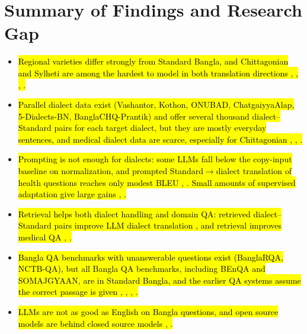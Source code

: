\section{Summary of Findings and Research Gap}\label{summary-of-findings-and-research-gap}

\begin{itemize}
\item \hl{Regional varieties differ strongly from Standard Bangla, and
Chittagonian and Sylheti are among the hardest to model in both
translation directions \cite{jawad2026fivedialects}, \cite{faria2023vashantor}, \cite{khandaker2024bridging}, \cite{prantik2025}.}

\item \hl{Parallel dialect data exist (Vashantor, Kothon, ONUBAD,
ChatgaiyyaAlap, 5-Dialects-BN, BanglaCHQ-Prantik) and offer several
thousand dialect--Standard pairs for each target dialect, but they are
mostly everyday sentences, and medical dialect data are scarce,
especially for Chittagonian \cite{faria2023vashantor}, \cite{jawad2026fivedialects}, \cite{prantik2025}.}

\item \hl{Prompting is not enough for dialects: some LLMs fall below the
copy-input baseline on normalization, and prompted Standard\ensuremath{\rightarrow}dialect
translation of health questions reaches only modest BLEU \cite{jawad2026fivedialects},
\cite{prantik2025}. Small amounts of supervised adaptation give large gains
\cite{jawad2026fivedialects}, \cite{faria2023vashantor}.}

\item \hl{Retrieval helps both dialect handling and domain QA: retrieved
dialect--Standard pairs improve LLM dialect translation \cite{sami2025comparative}, and
retrieval improves medical QA \cite{banglamedqa}, \cite{xiong2024medrag}.}

\item \hl{Bangla QA benchmarks with unanswerable questions exist (BanglaRQA,
NCTB-QA), but all Bangla QA benchmarks, including BEnQA and SOMAJGYAAN,
are in Standard Bangla, and the earlier QA systems assume the correct
passage is given \cite{ekram2022banglarqa}, \cite{nctbqa}, \cite{shafayat2024benqa}, \cite{shifa2025somajgyaan}.}

\item \hl{LLMs are not as good as English on Bangla questions, and open
source models are behind closed source models \cite{shafayat2024benqa}, \cite{shifa2025somajgyaan}.}


\end{itemize}
